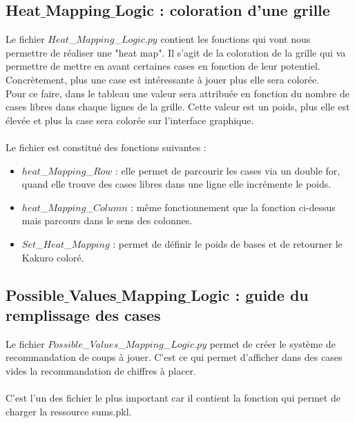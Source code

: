 \documentclass[12pt]{article}
\begin{document}
\subsection{Heat$\_$Mapping$\_$Logic : coloration d'une grille}

Le fichier $Heat$\_$Mapping$\_$Logic.py$ contient les fonctions qui vont nous permettre de réaliser une "heat map". Il s'agit de la coloration de la grille qui va permettre de mettre en avant certaines cases en fonction de leur potentiel. Concrètement, plus une case est intéressante à jouer plus elle sera colorée. \\
Pour ce faire, dans le tableau une valeur sera attribuée en fonction du nombre de cases libres dans chaque lignes de la grille. Cette valeur est un poids, plus elle est élevée et plus la case sera colorée sur l'interface graphique.  \\ \\

Le fichier est constitué des fonctions suivantes : \\
\begin{itemize}

\item[]$heat$\_$Mapping$\_$Row$ : elle permet de parcourir les cases via un double for, quand elle trouve des cases libres dans  une ligne elle incrémente le poids. \\

\item[]$heat$\_$Mapping$\_$Column$ : même fonctionnement que la fonction ci-dessus mais parcours dans le sens des colonnes. \\

\item[]$Set$\_$Heat$\_$Mapping$ : permet de définir le poids de bases et de retourner le Kakuro coloré.\\
\end{itemize}

\subsection{Possible$\_$Values$\_$Mapping$\_$Logic : guide du remplissage des cases}
Le fichier $Possible$\_$Values$\_$Mapping$\_$Logic.py$ permet de créer le système de recommandation de coups à jouer. C'est ce qui permet d'afficher dans des cases vides la recommandation de chiffres à placer. \\ \\
C'est l'un des fichier le plus important car il contient la fonction qui permet de charger la ressource sums.pkl. \\ \\
\end{document}
